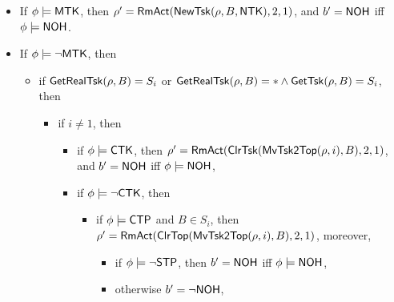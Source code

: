 {\begin{itemize}
\item If $\phi \models {\sf MTK}$,  then $\rho' = \mathsf{RmAct}(\mathsf{NewTsk}(\rho, B, {\sf NTK}), 2, 1)$, and $b' = {\sf NOH}$ iff $\phi \models {\sf NOH}$.
%
\item If $\phi \models \neg {\sf MTK}$,  then
	\begin{itemize}
        \item if $\mathsf{GetRealTsk}(\rho, B) = S_i$ or $\mathsf{GetRealTsk}(\rho,B) = * \wedge\mathsf{GetTsk}(\rho,B) = S_i$, then
        \begin{itemize}
        \item if $i \neq 1$, then 
			\begin{itemize}
				\item if $\phi \models {\sf CTK}$, then $\rho' = \mathsf{RmAct}(\mathsf{ClrTsk}(\mathsf{MvTsk2Top}(\rho, i), B), 2, 1)$, and $b' = {\sf NOH}$ iff $\phi \models {\sf NOH}$, 
				\item if $\phi \models \neg {\sf CTK}$, then
					\begin{itemize}
						\item if $\phi \models{\sf CTP}$ and $B \in S_i$, then $\rho' = \mathsf{RmAct}(\mathsf{ClrTop}(\mathsf{MvTsk2Top}(\rho, i), B), 2, 1)$,
						moreover, 
						\begin{itemize}
							\item if $\phi\models \neg {\sf STP}$, then $b' = {\sf NOH}$ iff $\phi \models {\sf NOH}$, 
							\item otherwise $b' = \neg {\sf NOH}$, 

\end{itemize}
\end{itemize}
\end{itemize}
\end{itemize}
\end{itemize}
\end{itemize}}
